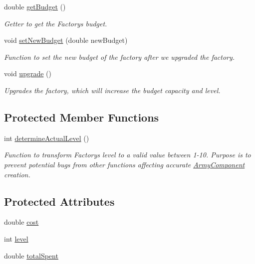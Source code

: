 \begin{DoxyCompactItemize}
double \mbox{\hyperlink{class_unit_factory_a1e58c093e5e132344cbcba117e6b03b3}{get\+Budget}} ()
\begin{DoxyCompactList}\small\item\em Getter to get the Factory\textquotesingle{}s budget. \end{DoxyCompactList}\item 
void \mbox{\hyperlink{class_unit_factory_a7d8d6b90c54a3cbc230ef5f4c80283d5}{set\+New\+Budget}} (double new\+Budget)
\begin{DoxyCompactList}\small\item\em Function to set the new budget of the factory after we upgraded the factory. \end{DoxyCompactList}\item 
void \mbox{\hyperlink{class_unit_factory_aae3d51fcddd57d4fd03582490d3a05ef}{upgrade}} ()
\begin{DoxyCompactList}\small\item\em Upgrades the factory, which will increase the budget capacity and level. \end{DoxyCompactList}\end{DoxyCompactItemize}
\subsection*{Protected Member Functions}
\begin{DoxyCompactItemize}
\item 
int \mbox{\hyperlink{class_unit_factory_a92120c06793ae808668a811e85efe2cb}{determine\+Actual\+Level}} ()
\begin{DoxyCompactList}\small\item\em Function to transform Factory\textquotesingle{}s level to a valid value between 1-\/10. Purpose is to prevent potential bugs from other functions affecting accurate \mbox{\hyperlink{class_army_component}{Army\+Component}} creation. \end{DoxyCompactList}\end{DoxyCompactItemize}
\subsection*{Protected Attributes}
\begin{DoxyCompactItemize}
\item 
double \mbox{\hyperlink{class_unit_factory_a6fedd057efbea8ae0f0c04f28a79faac}{cost}}
\item 
int \mbox{\hyperlink{class_unit_factory_ac8b73a1ed9adc43991450eb9aed0d40a}{level}}
\item 
double \mbox{\hyperlink{class_unit_factory_ad26bc01db5794994a888a6973c421df1}{total\+Spent}}
\end{DoxyCompactItemize}


